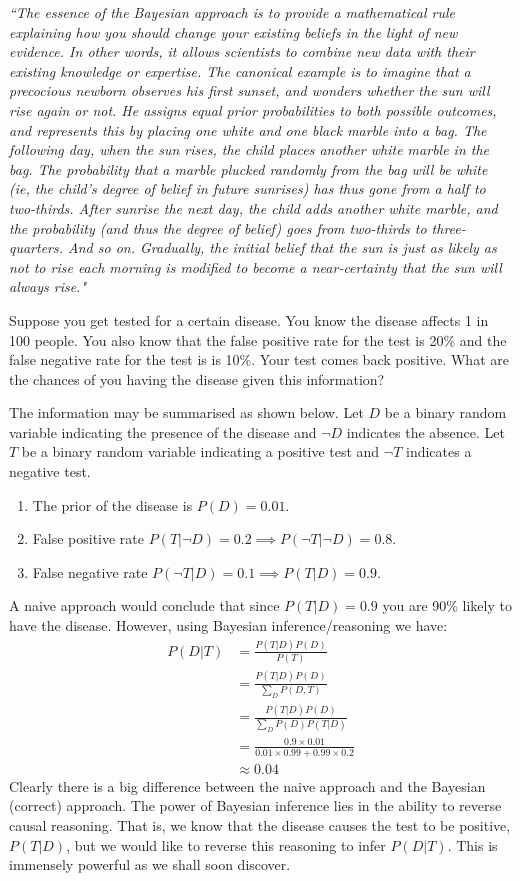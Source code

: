 \documentclass[../masters.tex]{subfiles}
\begin{document}
\textit{``The essence of the Bayesian approach is to provide a mathematical rule explaining how you should change your existing beliefs in the light of new evidence. In other words, it allows scientists to combine new data with their existing knowledge or expertise. The canonical example is to imagine that a precocious newborn observes his first sunset, and wonders whether the sun will rise again or not. He assigns equal prior probabilities to both possible outcomes, and represents this by placing one white and one black marble into a bag. The following day, when the sun rises, the child places another white marble in the bag. The probability that a marble plucked randomly from the bag will be white (ie, the child's degree of belief in future sunrises) has thus gone from a half to two-thirds. After sunrise the next day, the child adds another white marble, and the probability (and thus the degree of belief) goes from two-thirds to three-quarters. And so on. Gradually, the initial belief that the sun is just as likely as not to rise each morning is modified to become a near-certainty that the sun will always rise."}

Suppose you get tested for a certain disease. You know the disease affects 1 in 100 people. You also know that the false positive rate for the test is 20\% and the false negative rate for the test is is 10\%. Your test comes back positive. What are the chances of you having the disease given this information?

The information may be summarised as shown below. Let $D$ be a binary random variable indicating the presence of the disease and $\neg D$ indicates the absence. Let $T$ be a binary random variable indicating a positive test and $\neg T$ indicates a negative test. 
\begin{enumerate}
\item
The prior of the disease is $P(D) = 0.01$.
\item
False positive rate $P(T|\neg D) = 0.2 \implies P(\neg T|\neg D) = 0.8$.
\item
False negative rate $P(\neg T|D) = 0.1 \implies P(T|D) = 0.9$.
\end{enumerate}
A naive approach would conclude that since $P(T|D) = 0.9$ you are 90\% likely to have the disease. However, using Bayesian inference/reasoning we have: 
\begin{equation*}
\begin{aligned}
P(D|T) &= \frac{P(T|D)P(D)}{P(T)} \\
&=  \frac{P(T|D)P(D)}{\sum_D P(D,T)} \\
&= \frac{P(T|D)P(D)}{\sum_D P(D)P(T|D)} \\
& = \frac{0.9 \times 0.01}{0.01 \times 0.99 + 0.99 \times 0.2} \\
&\approx 0.04
\end{aligned}
\end{equation*}
Clearly there is a big difference between the naive approach and the Bayesian (correct) approach. The power of Bayesian inference lies in the ability to reverse causal reasoning. That is, we know that the disease causes the test to be positive, $P(T|D)$, but we would like to reverse this reasoning to infer $P(D|T)$. This is immensely powerful as we shall soon discover.   
\end{document}
